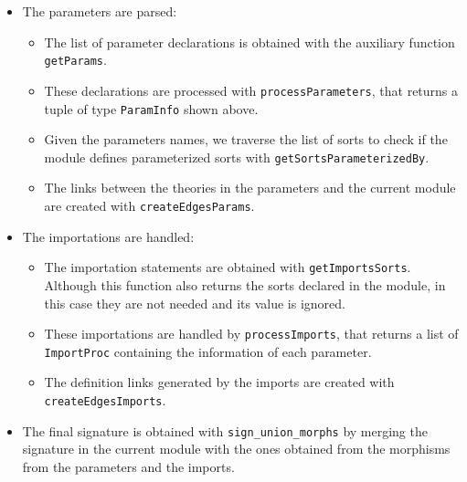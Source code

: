 \begin{itemize}
\item The parameters are parsed:

\begin{itemize}
\item The list of parameter declarations is obtained with the auxiliary
function \verb"getParams".
\item These declarations are processed with \verb"processParameters",
that returns a tuple of type \verb"ParamInfo" shown above.
\item Given the parameters names, we traverse the list of sorts to check
if the module defines parameterized sorts with \verb"getSortsParameterizedBy".
\item The links between the theories in the parameters and the current module
are created with \verb"createEdgesParams".
\end{itemize}

\item The importations are handled:

\begin{itemize}
\item The importation statements are obtained with \verb"getImportsSorts".
Although this function also returns the sorts declared in the module, in
this case they are not needed and its value is ignored.
\item These importations are handled by \verb"processImports", that
returns a list of \verb"ImportProc" containing the information of each
parameter.
\item The definition links generated by the imports are created with
\verb"createEdgesImports".
\end{itemize}

\item The final signature is obtained with \verb"sign_union_morphs"
by merging the signature in the current module with the ones obtained
from the morphisms from the parameters and the imports.

\end{itemize}

